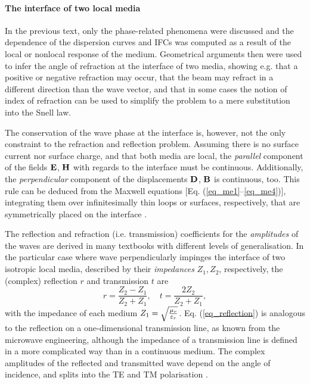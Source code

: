 \paragraph{The interface of two local media} %
In the previous text, only the phase-related phenomena were discussed and the dependence of the dispersion curves and IFCs was computed as a result of the local or nonlocal response of the medium. Geometrical arguments then were used to infer the angle of refraction at the interface of two media, showing e.g. that a positive or negative refraction may occur, that the beam may refract in a different direction than the wave vector, and that in some cases the notion of index of refraction can be used to simplify the problem to a mere substitution into the Snell law.

The conservation of the wave phase at the interface is, however, not the only constraint to the refraction and reflection problem. Assuming there is no surface current nor surface charge, and that both media are local, the \textit{parallel} component of the fields $\mathbf{E}$, $\mathbf{H}$ with regards to the interface must be continuous. Additionally, the \textit{perpendicular} component of the displacements $\mathbf{D}$, $\mathbf{B}$ is continuous, too. This rule can be deduced from the Maxwell equations [Eq.  (\ref{eq_me1}--\ref{eq_me4})], integrating them over infinitesimally thin loops or surfaces, respectively, that are symmetrically placed on the interface \cite[pp. 26-29]{klingshirn2007semiconductor}. 

The reflection and refraction (i.e. transmission) coefficients for the \textit{amplitudes} of the waves are derived in many textbooks  with different levels of generalisation.  
In the particular case where wave perpendicularly impinges the interface of two isotropic local media, described by their \textit{impedances} $Z_1, Z_2$, respectively, the (complex) reflection $r$ and transmission $t$ are
\begin{equation} r = \frac{Z_2 - Z_1}{Z_2+Z_1}, \quad t = \frac{2 Z_2}{Z_2 + Z_1}, \label{eq_reflection}\end{equation}
with the impedance of each medium
$Z_{1} = \sqrt{\frac{\mu_r}{\varepsilon_r}}$.
Eq. (\ref{eq_reflection}) is analogous to the reflection on a one-dimensional transmission line, as known from the microwave engineering, although the impedance of a transmission line is defined in a more complicated way than in a continuous medium.
The complex amplitudes of the reflected and transmitted wave depend on the angle of incidence, and splits into the TE and TM polarisation \cite[p. 38]{born1999book}.  %

